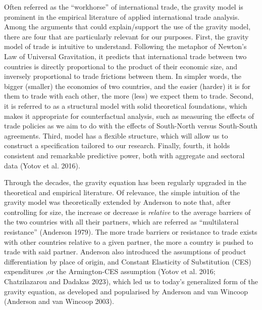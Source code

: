 \documentclass[12pt]{article}%
\begin{document}
Often referred as the ``workhorse'' of international trade, the gravity
model is prominent in the empirical literature of applied international
trade analysis. Among the arguments that could explain/support the use
of the gravity model, there are four that are particularly relevant for
our purposes. First, the gravity model of trade is intuitive to
understand. Following the metaphor of Newton's Law of Universal
Gravitation, it predicts that international trade between two countries
is directly proportional to the product of their economic size, and
inversely proportional to trade frictions between them. In simpler
words, the bigger (smaller) the economies of two countries, and the
easier (harder) it is for them to trade with each other, the more (less)
we expect them to trade. Second, it is referred to as a structural model
with solid theoretical foundations, which makes it appropriate for
counterfactual analysis, such as measuring the effects of trade policies
as we aim to do with the effects of South-North versus South-South
agreements. Third, model has a flexible structure, which will allow us
to construct a specification tailored to our research. Finally, fourth,
it holds consistent and remarkable predictive power, both with aggregate
and sectoral data (Yotov et al. 2016).

Through the decades, the gravity equation has been regularly upgraded in
the theoretical and empirical literature. Of relevance, the simple
intuition of the gravity model was theoretically extended by Anderson to
note that, after controlling for size, the increase or decrease is
\emph{relative} to the average barriers of the two countries with all
their partners, which are referred as ``multilateral resistance''
(Anderson 1979). The more trade barriers or resistance to trade exists
with other countries relative to a given partner, the more a country is
pushed to trade with said partner. Anderson also introduced the
assumptions of product differentiation by place of origin, and Constant
Elasticity of Substitution (CES) expenditures ,or the Armington-CES
assumption (Yotov et al. 2016; Chatzilazarou and Dadakas 2023), which
led us to today's generalized form of the gravity equation, as developed
and popularised by Anderson and van Wincoop (Anderson and van Wincoop
2003).
\end{document}
